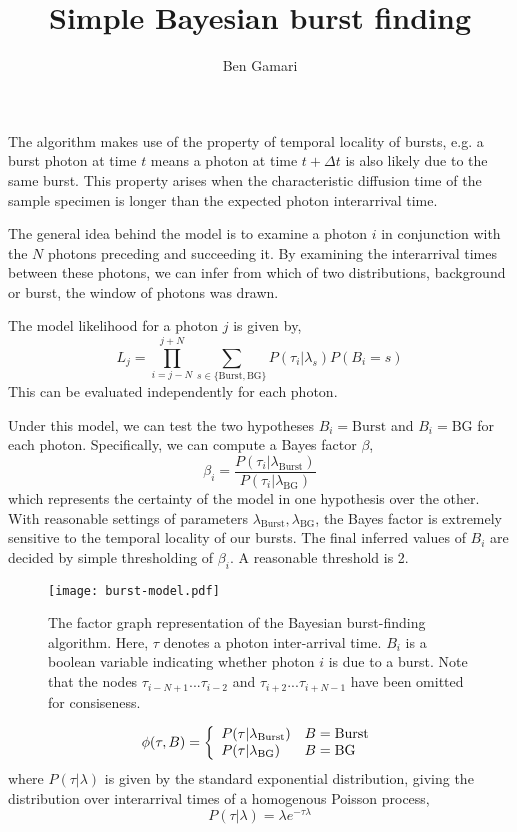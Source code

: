 \documentclass{article}
\title{Simple Bayesian burst finding}
\author{Ben Gamari}
\newcommand{\lburst}{\ensuremath{\lambda_\mathrm{Burst}}}
\newcommand{\lbg}{\ensuremath{\lambda_\mathrm{BG}}}
\begin{document}
\maketitle

The algorithm makes use of the property of temporal locality of
bursts, e.g. a burst photon at time $t$ means a photon at time $t +
\Delta t$ is also likely due to the same burst. This property arises
when the characteristic diffusion time of the sample specimen is 
longer than the expected photon interarrival time.

The general idea behind the model is to examine a photon $i$ in
conjunction with the $N$ photons preceding and succeeding it. By
examining the interarrival times between these photons, we can infer
from which of two distributions, background or burst, the window of
photons was drawn.

The model likelihood for a photon $j$ is given by,
\begin{equation}
  L_j = \prod_{i=j-N}^{j+N} \sum_{s\in\{\mathrm{Burst}, \mathrm{BG}\}} P(\tau_i \vert \lambda_s) P(B_i = s)
\end{equation}
This can be evaluated independently for each photon.

Under this model, we can test the two hypotheses $B_i =
\mathrm{Burst}$ and $B_i = \mathrm{BG}$ for each photon. Specifically,
we can compute a Bayes factor $\beta$,
\begin{equation}
  \beta_i = \frac{P(\tau_i \vert \lburst)}{P(\tau_i \vert \lbg)}
\end{equation}
which represents the certainty of the model in one hypothesis over the
other. With reasonable settings of parameters $\lburst, \lbg$, the
Bayes factor is extremely sensitive to the temporal locality of our
bursts. The final inferred values of $B_i$ are decided by simple
thresholding of $\beta_i$. A reasonable threshold is 2.

\begin{figure}
\centering
\texttt{[image: burst-model.pdf]}
\caption{The factor graph representation of the Bayesian burst-finding
algorithm. Here, $\tau$ denotes a photon inter-arrival time. $B_i$ is
a boolean variable indicating whether photon $i$ is due to a
burst. Note that the nodes $\tau_{i-N+1} ... \tau_{i-2}$ and
$\tau_{i+2} ... \tau_{i+N-1}$ have been omitted for consiseness.}
\end{figure}

\begin{equation}
  \phi(\tau, B) = \left\{
    \begin{array}{l l}
      P(\tau \vert \lambda_\mathrm{Burst})  & B = \mathrm{Burst} \\
      P(\tau \vert \lambda_\mathrm{BG})     & B = \mathrm{BG} \\
    \end{array}
  \right.
\end{equation}
where $P(\tau \vert \lambda)$ is given by the standard exponential
distribution, giving the distribution over interarrival times of a
homogenous Poisson process,
\[ P(\tau \vert \lambda) = \lambda e^{-\tau \lambda} \]
\end{document}
